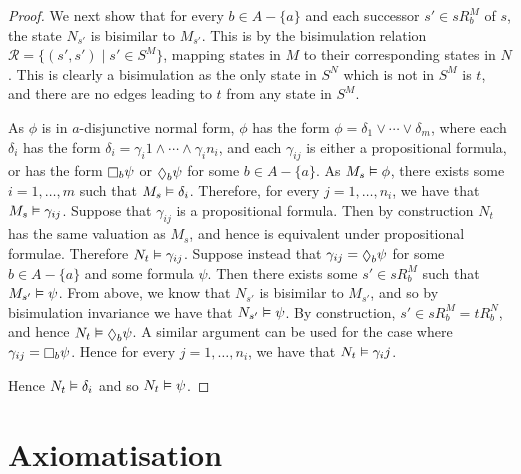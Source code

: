 \begin{proof}
We next show that for every $b \in A - \{a\}$ and each successor $s' \in sR^M_b$
of $s$, the state $N_{s'}$ is bisimilar to $M_{s'}$. This is by the bisimulation
relation $\mathcal{R} = \{(s', s') \mid s' \in S^M \}$, mapping states in
$M$ to their corresponding states in $N$. This is clearly a bisimulation as the
only state in $S^N$ which is not in $S^M$ is $t$, and there are no edges leading
to $t$ from any state in $S^M$.

As $\phi$ is in $a$-disjunctive normal form, $\phi$ has the form $\phi =
\delta_1 \lor \cdots \lor \delta_m$, where each $\delta_i$ has the form
$\delta_i = \gamma_i1 \land \cdots \land \gamma_i{n_i}$, and each $\gamma_{ij}$ is
either a propositional formula, or has the form $\knows_b \psi$ or $\suspects_b
\psi$ for some $b \in A - \{a\}$.  As $M_s \vDash \phi$, there exists some $i
= 1, \dots, m$ such that $M_s \vDash \delta_i$. Therefore, for every $j = 1,
\dots, n_i$, we have that $M_s \vDash \gamma_{ij}$. Suppose that
$\gamma_{ij}$ is a propositional formula. Then by construction $N_t$ has the
same valuation as $M_s$, and hence is equivalent under propositional formulae.
Therefore $N_t \vDash \gamma_{ij}$.  Suppose instead that $\gamma_{ij} =
\suspects_b \psi$ for some $b \in A - \{a\}$ and some formula $\psi$. Then there
exists some $s' \in sR^M_b$ such that $M_{s'} \vDash \psi$. From above, we
know that $N_{s'}$ is bisimilar to $M_{s'}$, and so by bisimulation invariance
we have that $N_{s'} \vDash \psi$.  By construction, $s' \in sR^M_b = tR^N_b$,
and hence $N_t \entails \suspects_b \psi$. A similar argument can be used for
the case where $\gamma_{ij} = \knows_b \psi$. Hence for every $j = 1, \dots,
n_i$, we have that $N_t \vDash \gamma_ij$.

Hence $N_t \vDash \delta_i$ and so $N_t \vDash \psi$.
\end{proof}

\section{Axiomatisation}

